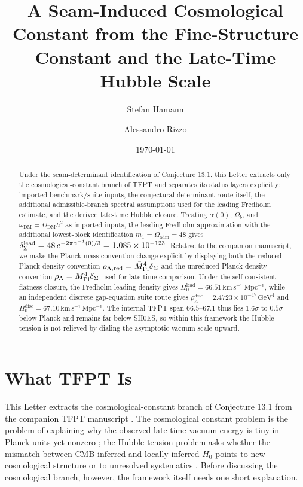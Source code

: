 

\title{A Seam-Induced Cosmological Constant from the Fine-Structure Constant and the Late-Time Hubble Scale}
\author{Stefan Hamann}
\noaffiliation
\author{Alessandro Rizzo}
\noaffiliation
\date{\today}

\begin{abstract}
Under the seam-determinant identification of Conjecture 13.1, this Letter extracts only the cosmological-constant branch of TFPT and separates its status layers explicitly: imported benchmark/suite inputs, the conjectural determinant route itself, the additional admissible-branch spectral assumptions used for the leading Fredholm estimate, and the derived late-time Hubble closure. Treating $\alpha(0)$, $\Omega_b$, and $\omega_{\mathrm{DM}}=\Omega_{\mathrm{DM}}h^2$ as imported inputs, the leading Fredholm approximation with the additional lowest-block identification $m_1=\Omega_{\mathrm{adm}}=48$ gives $\delta_{\Sigma}^{\mathrm{lead}}=48\,e^{-2\pi\alpha^{-1}(0)/3}=1.085\times10^{-123}$. Relative to the companion manuscript, we make the Planck-mass convention change explicit by displaying both the reduced-Planck density convention $\rho_{\Lambda,\mathrm{red}}=\bar M_{\mathrm{Pl}}^4\delta_{\Sigma}$ and the unreduced-Planck density convention $\rho_\Lambda=M_{\mathrm{Pl}}^4\delta_{\Sigma}$ used for late-time comparison. Under the self-consistent flatness closure, the Fredholm-leading density gives $H_0^{\mathrm{lead}}=66.51\,\mathrm{km\,s^{-1}\,Mpc^{-1}}$, while an independent discrete gap-equation suite route gives $\rho_\Lambda^{\mathrm{disc}}=2.4723\times10^{-47}\,\mathrm{GeV}^4$ and $H_0^{\mathrm{disc}}=67.10\,\mathrm{km\,s^{-1}\,Mpc^{-1}}$. The internal TFPT span $66.5$--$67.1$ thus lies $1.6\sigma$ to $0.5\sigma$ below Planck and remains far below SH0ES, so within this framework the Hubble tension is not relieved by dialing the asymptotic vacuum scale upward.
\end{abstract}

\maketitle

\section{What TFPT Is}

This Letter extracts the cosmological-constant branch of Conjecture 13.1 from the companion TFPT manuscript \cite{tfpt31}. The cosmological constant problem is the problem of explaining why the observed late-time vacuum energy is tiny in Planck units yet nonzero \cite{einstein1917,weinberg1989}; the Hubble-tension problem asks whether the mismatch between CMB-inferred and locally inferred $H_0$ points to new cosmological structure or to unresolved systematics \cite{planck2018,riess2022}. Before discussing the cosmological branch, however, the framework itself needs one short explanation.

